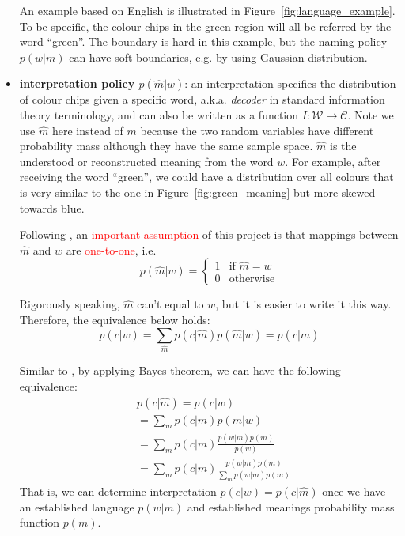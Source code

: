 \documentclass[11pt]{article}
\begin{document}
\begin{itemize}[leftmargin=*]
    An example based on English is illustrated in Figure~\ref{fig:language_example}.
    To be specific, the colour chips in the green region will all be referred by the word ``green''.
    The boundary is hard in this example, but the naming policy $p(w|m)$ can have soft boundaries, e.g. by using Gaussian distribution.
    
    \item \textbf{interpretation policy $p(\hat{m}|w)$\label{par:decoder}}: an interpretation specifies the distribution of colour chips given a specific word, a.k.a. \emph{decoder} in standard information theory terminology, and can also be written as a function $I:\mathcal{W}\rightarrow\mathcal{C}$.
    Note we use $\hat{m}$ here instead of $m$ because the two random variables have different probability mass although they have the same sample space. 
    $\hat{m}$ is the understood or reconstructed meaning from the word $w$.
    For example, after receiving the word ``green'', we could have a distribution over all colours that is very similar to the one in Figure~\ref{fig:green_meaning} but more skewed towards blue.
    
    Following \citet{zaslavsky2018efficient}, an \textcolor{red}{important assumption} of this project is that mappings between $\hat{m}$ and $w$ are \textcolor{red}{one-to-one}, i.e.
    \begin{equation}
        p(\hat{m}|w) =
        \begin{cases}
            1 & \text{if $\hat{m}=w$}\\
            0 & \text{otherwise}
        \end{cases} 
        \label{eq:bijective_mhat_w}
    \end{equation}
    
    Rigorously speaking, $\hat{m}$ can't equal to $w$, but it is easier to write it this way. Therefore, the equivalence below holds:
    \begin{equation}
        p(c|w)  = \sum_{\hat{m}} p(c|\hat{m})p(\hat{m}|w)  = p(c|\hat{m})
        \label{eq:p_mhat_and_m}
    \end{equation}
    
    Similar to \citep{zaslavsky2018efficient}, by applying Bayes theorem, we can have the following equivalence:
    \begin{equation}
        \begin{split}
            & p(c|\hat{m}) = p(c|w) \\
            & = \sum_m p(c|m)p(m|w) \\
            & = \sum_m p(c|m) \frac{p(w|m)p(m)}{p(w)} \\
            & = \sum_m p(c|m) \frac{p(w|m)p(m)}{\sum_m p(w|m)p(m)}
        \end{split}
        \label{eq:bayesian_interpretation}
    \end{equation}
    That is, we can determine interpretation $p(c|w) = p(c|\hat{m})$ once we have an established language $p(w|m)$ and established meanings probability mass function $p(m)$.
    
    
\end{itemize}
\end{document}
